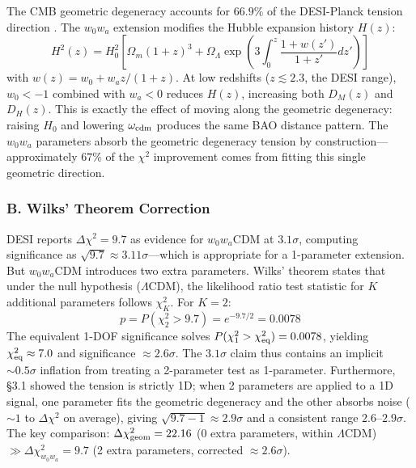 \documentclass[12pt,preprint]{aastex631}
\newcommand{\chisq}{\chi^2}
\begin{document}
The CMB geometric degeneracy accounts for $66.9\%$ of the DESI-Planck tension direction \citep{sam2026}. The $w_0 w_a$ extension modifies the Hubble expansion history $H(z)$:
\begin{equation}
H^2(z) = H_0^2 \left[ \Omega_m (1+z)^3 + \Omega_\Lambda \exp\left(3\int_0^z \frac{1+w(z')}{1+z'} dz'\right) \right]
\label{eq:hz}
\end{equation}
with $w(z) = w_0 + w_a z/(1+z)$. At low redshifts ($z \lesssim 2.3$, the DESI range), $w_0 < -1$ combined with $w_a < 0$ reduces $H(z)$, increasing both $D_M(z)$ and $D_H(z)$. This is exactly the effect of moving along the geometric degeneracy: raising $H_0$ and lowering $\omega_{\rm cdm}$ produces the same BAO distance pattern. The $w_0 w_a$ parameters absorb the geometric degeneracy tension by construction---approximately $67\%$ of the $\chi^2$ improvement comes from fitting this single geometric direction.

\subsubsection{B. Wilks' Theorem Correction}

DESI reports $\Delta\chisq = 9.7$ as evidence for $w_0 w_a$CDM at $3.1\sigma$, computing significance as $\sqrt{9.7} \approx 3.11\sigma$---which is appropriate for a 1-parameter extension. But $w_0 w_a$CDM introduces two extra parameters. Wilks' theorem \citep{gross2010} states that under the null hypothesis ($\Lambda$CDM), the likelihood ratio test statistic for $K$ additional parameters follows $\chisq_K$. For $K=2$:
\begin{equation}
p = P(\chisq_2 > 9.7) = e^{-9.7/2} = 0.0078
\label{eq:lookelsewhere}
\end{equation}
The equivalent 1-DOF significance solves $P(\chisq_1 > \chi^2_{\rm eq}) = 0.0078$, yielding $\chi^2_{\rm eq} \approx 7.0$ and significance $\approx 2.6\sigma$. The $3.1\sigma$ claim thus contains an implicit $\sim 0.5\sigma$ inflation from treating a 2-parameter test as 1-parameter. Furthermore, \S3.1 showed the tension is strictly 1D; when 2 parameters are applied to a 1D signal, one parameter fits the geometric degeneracy and the other absorbs noise ($\sim 1$ to $\Delta\chisq$ on average), giving $\sqrt{9.7-1} \approx 2.9\sigma$ and a consistent range $2.6$--$2.9\sigma$. The key comparison: $\Delta\chisq_{\rm geom} = 22.16$ (0 extra parameters, within $\Lambda$CDM) $\gg \Delta\chisq_{w_0 w_a} = 9.7$ (2 extra parameters, corrected $\approx 2.6\sigma$).
\end{document}
